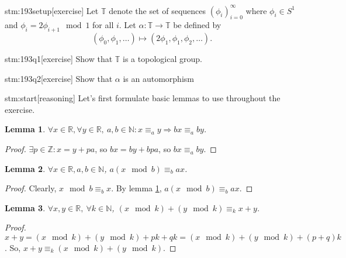 \documentclass{article}
\newtheorem{lemma}{Lemma}
\begin{document}

\begin{stm}{stm:193setup}[exercise]
Let $\mathbb{T}$ denote the set of sequences $(\phi_i)_{i=0}^{\infty}$ where $\phi_i \in S^1$ and $\phi_i = 2 \phi_{i+1} \mod 1$ for all $i$. Let $\alpha : \mathbb{T} \to \mathbb{T}$ be defined by 
\[
(\phi_0, \phi_1, \dots) \mapsto (2\phi_1, \phi_1, \phi_2, \dots).
\]
\end{stm}
\begin{stm}{stm:193q1}[exercise]
Show that $\mathbb{T}$ is a topological group.
\end{stm}

\begin{stm}{stm:193q2}[exercise]
Show that $\alpha$ is an automorphism
\end{stm}
    


\begin{stm}{stm:start}[reasoning]
Let's first formulate basic lemmas to use throughout the exercise.
\end{stm}

\begin{lemma}\label{lemma:1}
$\forall x \in \mathbb{R}, \forall y \in \mathbb{R}, \ a, b \in \mathbb{N} : x \equiv_a y \Rightarrow bx \equiv_{a} by$. 
\end{lemma}

\begin{proof}
$\exists p \in \mathbb{Z} : x = y + pa$, so $bx = by + bpa$, so $bx \equiv_{a} by$.
\end{proof}

\begin{lemma}\label{lemma:3}
$\forall x \in \mathbb{R}, a,b \in \mathbb{N}$, $a(x \mod b) \equiv_b ax$.
\end{lemma}

\begin{proof}
Clearly, $x \mod b \equiv_b x$. By lemma \ref{lemma:1}, $a(x \mod b) \equiv_b ax$.
\end{proof}

\begin{lemma}\label{lemma:4}
$\forall x, y \in \mathbb{R}, \ \forall k \in \mathbb{N}$, $( x \mod k ) + ( y \mod k ) \equiv_k x + y$.
\end{lemma}

\begin{proof}
$x + y = ( x \mod k ) + ( y \mod k ) + pk + qk = (x \mod k) + (y \mod k) + (p+q)k$. So, $x + y \equiv_k (x \mod k) + (y \mod k)$.
\end{proof}
\end{document}
